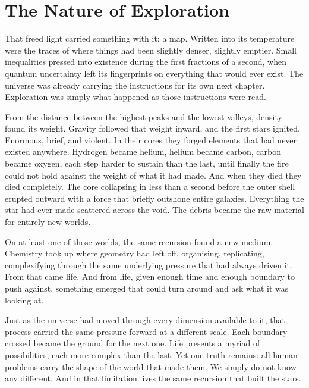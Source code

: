 \documentclass[12pt]{article}
\begin{document}
\section{The Nature of Exploration}

That freed light carried something with it: a map. Written into its temperature
were the traces of where things had been slightly denser, slightly emptier.
Small inequalities pressed into existence during the first fractions of a second,
when quantum uncertainty left its fingerprints on everything that would ever
exist. The universe was already carrying the instructions for its own next
chapter. Exploration was simply what happened as those instructions were read.

From the distance between the highest peaks and the lowest valleys, density
found its weight. Gravity followed that weight inward, and the first stars
ignited. Enormous, brief, and violent. In their cores they forged elements
that had never existed anywhere. Hydrogen became helium, helium became carbon,
carbon became oxygen, each step harder to sustain than the last, until finally
the fire could not hold against the weight of what it had made. And when they
died they died completely. The core collapsing in less than a second before
the outer shell erupted outward with a force that briefly outshone entire
galaxies. Everything the star had ever made scattered across the void. The debris
became the raw material for entirely new worlds.

On at least one of those worlds, the same recursion found a new medium.
Chemistry took up where geometry had left off, organising, replicating,
complexifying through the same underlying pressure that had always driven it.
From that came life. And from life, given enough time and enough boundary to
push against, something emerged that could turn around and ask what it was
looking at.

Just as the universe had moved through every dimension available to it, that
process carried the same pressure forward at a different scale. Each boundary
crossed became the ground for the next one. Life presents a myriad of
possibilities, each more complex than the last. Yet one truth remains: all human
problems carry the shape of the world that made them. We simply do not know any
different. And in that limitation lives the same recursion that built the stars.

\end{document}
